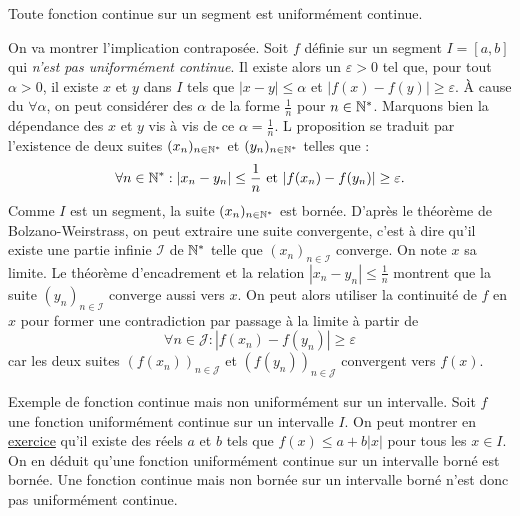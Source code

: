 \begin{thm} \label{prop:Heine}
 Toute fonction continue sur un segment est uniformément continue.
\end{thm}
\begin{demo}
On va montrer l'implication contraposée.\newline
Soit $f$ définie sur un segment $I=[a,b]$ qui \emph{ n'est pas uniformément continue}. Il existe alors un $\varepsilon >0$ tel que, pour tout $\alpha>0$, il existe $x$ et $y$ dans $I$ tels que $|x-y|\leq \alpha$ et $|f(x)-f(y)|\geq \varepsilon$.\newline
\`A cause du $\forall \alpha$, on peut considérer des $\alpha$ de la forme $\frac{1}{n}$ pour $n\in\mathbb{N}^*$. Marquons bien la dépendance des $x$ et $y$ vis à vis de ce $\alpha=\frac{1}{n}$. L proposition se traduit par l'existence de deux suites $(x_n)_{n\in\mathbb{N}^*}$ et $(y_n)_{n\in\mathbb{N}^*}$ telles que :
\begin{displaymath}
 \forall n\in \mathbb{N}^* : |x_n -y_n|\leq \frac{1}{n} \text{ et } |f(x_n)-f(y_n)|\geq \varepsilon.
\end{displaymath}
Comme $I$ est un segment, la suite $(x_n)_{n\in\mathbb{N}^*}$ est bornée. D'après le théorème de Bolzano-Weirstrass, on peut extraire une suite convergente, c'est à dire qu'il existe une partie infinie $\mathcal I$ de $\mathbb{N}^*$ telle que $(x_n)_{n\in\mathcal I}$ converge. On note $x$ sa limite.\newline
Le théorème d'encadrement et la relation $|x_n -y_n|\leq \frac{1}{n}$ montrent que la suite $(y_n)_{n\in\mathcal I}$ converge aussi vers $x$. On peut alors utiliser la continuité de $f$ en $x$ pour former une contradiction par passage à la limite à partir de
\begin{displaymath}
 \forall n\in \mathcal J :  |f(x_n)-f(y_n)|\geq \varepsilon
\end{displaymath}
car les deux suites $(f(x_n))_{n\in\mathcal J}$ et $(f(y_n))_{n\in\mathcal J}$ convergent vers $f(x)$.
\end{demo}
\begin{rem}
 Exemple de fonction continue mais non uniformément sur un intervalle. Soit $f$ une fonction uniformément continue sur un intervalle $I$. On peut montrer en \href{http://back.maquisdoc.net/v-1/index.php?act=chelt&id_elt=4798}{exercice} qu'il existe des réels $a$ et $b$ tels que $f(x)\leq a+b|x|$ pour tous les $x\in I$. On en déduit qu'une fonction uniformément continue sur un intervalle borné est bornée. Une fonction continue mais non bornée sur un intervalle borné n'est donc pas uniformément continue.
\end{rem}

